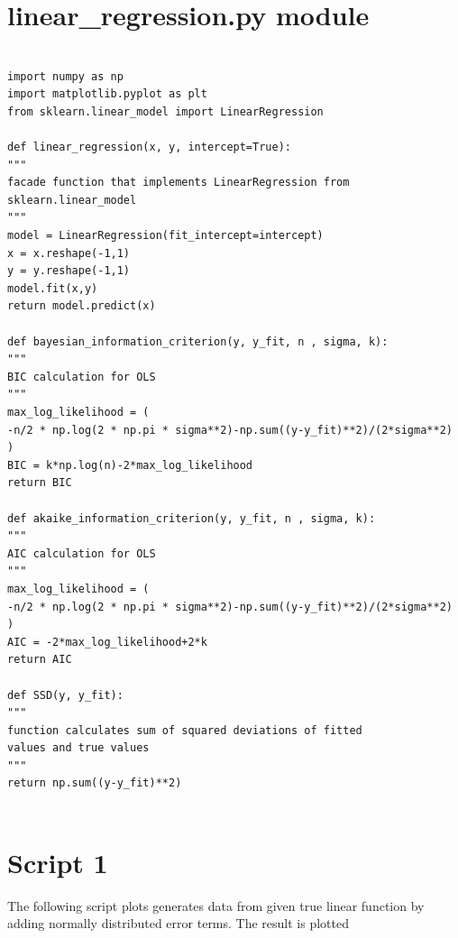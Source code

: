 \documentclass[12pt,a4paper,oneside]{book} %
\begin{document}
	\section{linear\_regression.py module}
	
	
\begin{mdframed}[linecolor=black, topline=true, bottomline=true,
	leftline=false, rightline=false, backgroundcolor=yellow!20!white]
	\begin{verbatim}
	
import numpy as np
import matplotlib.pyplot as plt
from sklearn.linear_model import LinearRegression

def linear_regression(x, y, intercept=True):
"""
facade function that implements LinearRegression from sklearn.linear_model
"""
model = LinearRegression(fit_intercept=intercept)
x = x.reshape(-1,1)
y = y.reshape(-1,1)
model.fit(x,y)
return model.predict(x)

def bayesian_information_criterion(y, y_fit, n , sigma, k):
"""
BIC calculation for OLS
"""
max_log_likelihood = (
-n/2 * np.log(2 * np.pi * sigma**2)-np.sum((y-y_fit)**2)/(2*sigma**2)
)
BIC = k*np.log(n)-2*max_log_likelihood
return BIC

def akaike_information_criterion(y, y_fit, n , sigma, k):
"""
AIC calculation for OLS
"""
max_log_likelihood = (
-n/2 * np.log(2 * np.pi * sigma**2)-np.sum((y-y_fit)**2)/(2*sigma**2)
)
AIC = -2*max_log_likelihood+2*k
return AIC

def SSD(y, y_fit):
"""
function calculates sum of squared deviations of fitted
values and true values
"""
return np.sum((y-y_fit)**2)
	
	\end{verbatim}
\end{mdframed}
	
	\section{Script 1}
	
The following script plots generates data from given true linear function by adding normally distributed error terms. The result is plotted 
	
\end{document}
